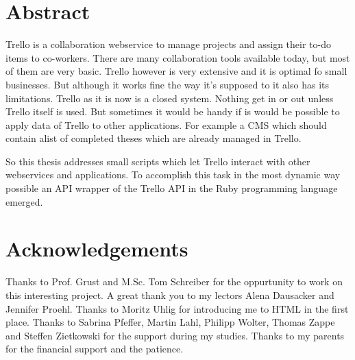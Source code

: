 \documentclass[twoside,12pt,a4paper, parskip=full-]{report}
\begin{document}

\setcounter{page}{1}



\section*{Abstract}

Trello is a collaboration webservice to manage projects and assign their to-do items to co-workers. There are many collaboration tools available today, but most of them are very basic. Trello however is very extensive and it is optimal fo small businesses. But although it works fine the way it's supposed to it also has its limitations. Trello as it is now is a closed system. Nothing get in or out unless Trello itself is used. But sometimes it would be handy if is would be possible to apply data of Trello to other applications. For example a CMS which should contain alist of completed theses which are already managed in Trello.
 
So this thesis addresses small scripts which let Trello interact with other webservices and applications. To accomplish this task in the most dynamic way possible an API wrapper of the Trello API in the Ruby programming language emerged.

\newpage

\section*{Acknowledgements}
Thanks to Prof. Grust and M.Sc. Tom Schreiber for the oppurtunity to work on this interesting project. A great thank you to my lectors Alena Dausacker and Jennifer Proehl. Thanks to Moritz Uhlig for introducing me to HTML in the first place. Thanks to Sabrina Pfeffer, Martin Lahl, Philipp Wolter, Thomas Zappe and Steffen Zietkowski for the support during my studies. Thanks to my parents for the financial support and the patience.

\cleardoublepage

\end{document}
